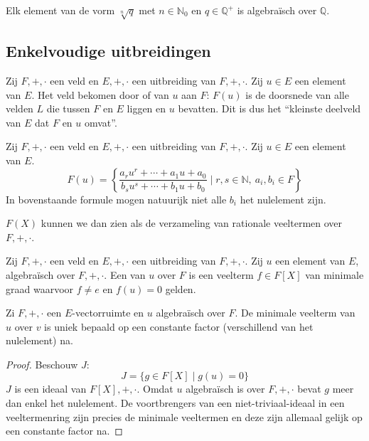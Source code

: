 \documentclass[main.tex]{subfiles}
\begin{document}
\begin{st}
  Elk element van de vorm $\sqrt[n]{q}$ met $n\in \mathbb{N}_{0}$ en $q\in \mathbb{Q}^{+}$ is algebra\"isch over $\mathbb{Q}$.
\end{st}

\subsection{Enkelvoudige uitbreidingen}
\label{sec:enkelv-uitbr}

\begin{de}
  Zij $F,+,\cdot$ een veld en $E,+,\cdot$ een uitbreiding van $F,+,\cdot$.
  Zij $u\in E$ een element van $E$.
  Het veld bekomen door  of  van $u$ aan $F$: $F(u)$ is de doorsnede van alle velden $L$ die tussen $F$ en $E$ liggen en $u$ bevatten.
  Dit is dus het ``kleinste deelveld van $E$ dat $F$ en $u$ omvat''.
\end{de}

\begin{ei}
  Zij $F,+,\cdot$ een veld en $E,+,\cdot$ een uitbreiding van $F,+,\cdot$.
  Zij $u\in E$ een element van $E$.
  \[
  F(u) = 
  \left\{
      \frac
        {a_{r}u^{r} + \dotsb + a_{1} u + a_{0}}
        {b_{s}u^{s} + \dotsb + b_{1} u + b_{0}}
  \mid r,s \in \mathbb{N},\ a_{i},b_{i} \in F
  \right\}
  \]
  In bovenstaande formule mogen natuurijk niet alle $b_{i}$ het nulelement zijn.
\end{ei}

\begin{opm}
  $F(X)$ kunnen we dan zien als de verzameling van rationale veeltermen over $F,+,\cdot$.
\end{opm}

\begin{de}
  Zij $F,+,\cdot$ een veld en $E,+,\cdot$ een uitbreiding van $F,+,\cdot$.
  Zij $u$ een element van $E$, algebra\"isch over $F,+,\cdot$.
  Een  van $u$ over $F$ is een veelterm $f\in F[X]$ van minimale graad waarvoor $f\neq e$ en $f(u) = 0$ gelden.
\end{de}

\begin{pr}
  \label{pr:minimale-veelterm-uniek}
  Zi $F,+,\cdot$ een $E$-vectorruimte en $u$ algebra\"isch over $F$.
  De minimale veelterm van $u$ over $v$ is uniek bepaald op een constante factor (verschillend van het nulelement) na.

  \begin{proof}
    Beschouw $J$:
    \[ J = \{ g\in F[X] \mid g(u) = 0 \} \]
    $J$ is een ideaal van $F[X],+,\cdot$.
    Omdat $u$ algebra\"isch is over $F,+,\cdot$ bevat $g$ meer dan enkel het nulelement.
    De voortbrengers van een niet-triviaal-ideaal in een veeltermenring zijn precies de minimale veeltermen  en deze zijn allemaal gelijk op een constante factor na.
  \end{proof}
\end{pr}
\end{document}
